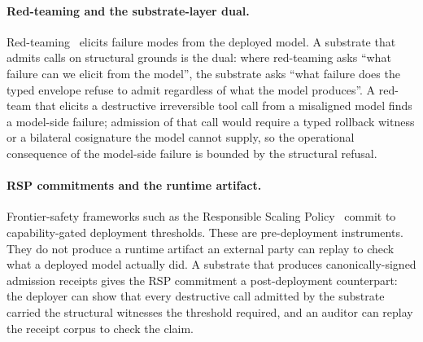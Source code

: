\paragraph{Red-teaming and the substrate-layer dual.}
Red-teaming~\cite{perezRedTeaming2022} elicits failure modes from the deployed model. A substrate that admits calls on structural grounds is the dual: where red-teaming asks ``what failure can we elicit from the model'', the substrate asks ``what failure does the typed envelope refuse to admit regardless of what the model produces''. A red-team that elicits a destructive irreversible tool call from a misaligned model finds a model-side failure; admission of that call would require a typed rollback witness or a bilateral cosignature the model cannot supply, so the operational consequence of the model-side failure is bounded by the structural refusal.

\paragraph{RSP commitments and the runtime artifact.}
Frontier-safety frameworks such as the Responsible Scaling Policy~\cite{anthropicRSP2023} commit to capability-gated deployment thresholds. These are pre-deployment instruments. They do not produce a runtime artifact an external party can replay to check what a deployed model actually did. A substrate that produces canonically-signed admission receipts gives the RSP commitment a post-deployment counterpart: the deployer can show that every destructive call admitted by the substrate carried the structural witnesses the threshold required, and an auditor can replay the receipt corpus to check the claim.

